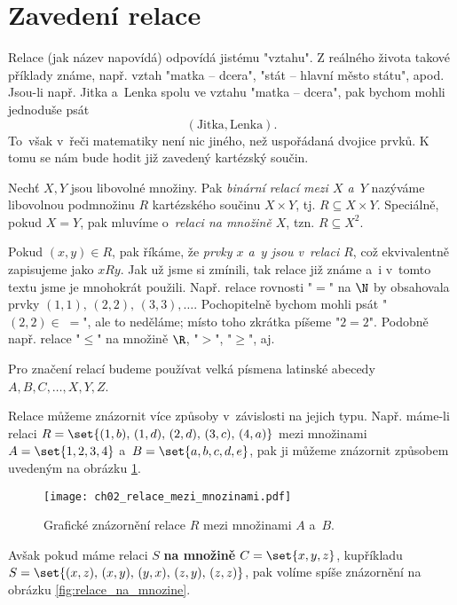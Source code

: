 \section{Zavedení relace}\label{sec:zavedeni_relace}
Relace (jak název napovídá) odpovídá jistému "vztahu". Z reálného života takové příklady známe, např. vztah "matka -- dcera", "stát -- hlavní město státu", apod. Jsou-li např. Jitka a~Lenka spolu ve vztahu "matka -- dcera", pak bychom mohli jednoduše psát
\begin{equation*}
    (\text{Jitka}, \text{Lenka}).
\end{equation*}
To~však v~řeči matematiky není nic jiného, než uspořádaná dvojice prvků. K tomu se nám bude hodit již zavedený kartézský součin.
\begin{definition}[Relace]\label{def:relace}
    Nechť $X,Y$ jsou libovolné množiny. Pak \emph{binární relací mezi $X$ a~$Y$} nazýváme libovolnou podmnožinu $R$ kartézského součinu $X\times Y$, tj. $R\subseteq X \times Y$. Speciálně, pokud $X=Y$, pak mluvíme o~\emph{relaci na množině $X$}, tzn. $R\subseteq X^2$.
\end{definition}
Pokud $(x,y)\in R$, pak říkáme, že \emph{prvky $x$ a~$y$ jsou v~relaci $R$}, což ekvivalentně zapisujeme jako $xRy$. Jak už jsme si zmínili, tak relace již známe a~i v~tomto textu jsme je mnohokrát použili. Např. relace rovnosti "$=$" na $\N$ by obsahovala prvky $(1,1),\,(2,2),\,(3,3),\dots$. Pochopitelně bychom mohli psát "$(2,2)\in\;=$", ale to neděláme; místo toho zkrátka píšeme "$2=2$". Podobně např. relace "$\leq$" na množině $\R$, "$>$", "$\geq$", aj.
\begin{convention}
    Pro značení relací budeme používat velká písmena latinské abecedy $A,B,C,\dots,X,Y,Z$.
\end{convention}
Relace můžeme znázornit více způsoby v~závislosti na jejich typu. Např. máme-li relaci $R=\set{(1,b),\,(1,d),\,(2,d),\,(3,c),\,(4,a)}$ mezi množinami $A=\set{1,2,3,4}$ a~$B=\set{a,b,c,d,e}$, pak ji můžeme znázornit způsobem uvedeným na obrázku \ref{fig:relace_mezi_mnozinami}.
\begin{figure}[H]
    \centering
    \texttt{[image: ch02\_relace\_mezi\_mnozinami.pdf]}
    \caption{Grafické znázornění relace $R$ mezi množinami $A$ a~$B$.}
    \label{fig:relace_mezi_mnozinami}
\end{figure}
Avšak pokud máme relaci $S$ \textbf{na množině} $C=\set{x,y,z}$, kupříkladu $S=\set{(x,z),\,(x,y),\,(y,x),\,(z,y),\,(z,z)}$, pak volíme spíše znázornění na obrázku \ref{fig:relace_na_mnozine}.
